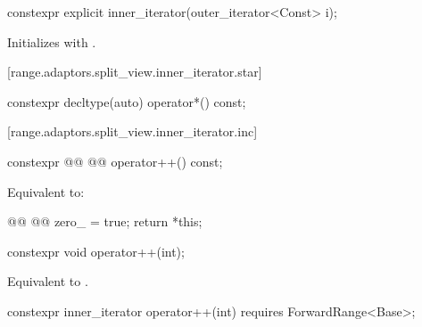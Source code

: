 %
\begin{itemdecl}
constexpr explicit inner_iterator(outer_iterator<Const> i);
\end{itemdecl}

\begin{itemdescr}
\pnum
\effects Initializes  with .
\end{itemdescr}

[range.adaptors.split_view.inner_iterator.star]{}

%
\begin{itemdecl}
constexpr decltype(auto) operator*() const;
\end{itemdecl}

\begin{itemdescr}
\pnum
{}

\end{itemdescr}

[range.adaptors.split_view.inner_iterator.inc]{}

%
\begin{itemdecl}
constexpr @@ @@ operator++() const;
\end{itemdecl}

\begin{itemdescr}
\pnum
\effects Equivalent to:
\begin{codeblock}
@@
@@
zero_ = true;
return *this;
\end{codeblock}
\end{itemdescr}

%
\begin{itemdecl}
constexpr void operator++(int);
\end{itemdecl}

\begin{itemdescr}
\pnum
\effects Equivalent to .
\end{itemdescr}

%
\begin{itemdecl}
constexpr inner_iterator operator++(int) requires ForwardRange<Base>;
\end{itemdecl}

